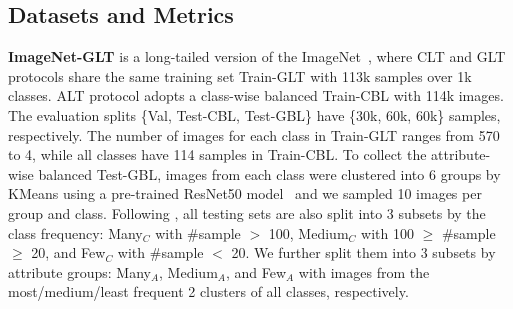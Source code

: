 \documentclass{article}
\begin{document}
\subsection{Datasets and Metrics} 



\noindent\textbf{ImageNet-GLT} is a long-tailed version of the ImageNet~\cite{russakovsky2015imagenet}, where CLT and GLT protocols share the same training set Train-GLT with 113k samples over 1k classes. ALT protocol adopts a class-wise balanced Train-CBL with 114k images. The evaluation splits \{Val, Test-CBL, Test-GBL\} have \{30k, 60k, 60k\} samples, respectively. The number of images for each class in Train-GLT ranges from 570 to 4, while all classes have 114 samples in Train-CBL. To collect the attribute-wise balanced Test-GBL, images from each class were clustered into 6 groups by KMeans using a pre-trained ResNet50 model~\cite{NEURIPS2019_9015} and we sampled 10 images per group and class. Following \cite{liu2019large,kang2019decoupling}, all testing sets are also split into 3 subsets by the class frequency: Many$_C$ with \#sample $>$ 100, Medium$_C$ with 100 $\geq$ \#sample $\geq$ 20, and Few$_C$ with \#sample $<$ 20. We further split them into 3 subsets by attribute groups: Many$_A$, Medium$_A$, and Few$_A$ with images from the most/medium/least frequent 2 clusters of all classes, respectively. 
\end{document}
